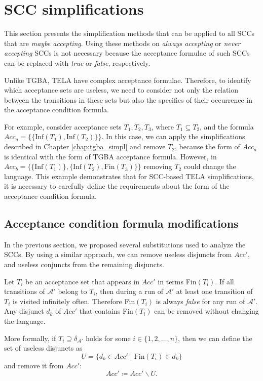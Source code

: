 \documentclass[
  digital, %
  twoside, %
  table,   %
  lof,     %
  lot,     %
]{fithesis3}
\begin{document}
\section{SCC simplifications}
This section presents the simplification methods that can be applied to all SCCs that are \emph{maybe accepting}. Using these methods on \emph{always accepting} or \emph{never accepting} SCCs is not necessary because the acceptance formulae of such SCCs can be replaced with \emph{true} or \emph{false}, respectively. 

Unlike TGBA, TELA have complex acceptance formulae. Therefore, to identify which acceptance sets are useless, we need to consider not only the relation between the transitions in these sets but also the specifics of their occurrence in the acceptance condition formula. 

For example, consider acceptance sets $T_1, T_2, T_3$, where $T_1 \subseteq T_2$, and the formula $Acc_a = \{\{\text{Inf}(T_1), \text{Inf}(T_2)\}\}$. In this case, we can apply the simplifications described in Chapter \ref{chap:tgba_simpl} and remove $T_2$, because the form of $Acc_a$ is identical with the form of TGBA acceptance formula. However, in $Acc_b = \{\{\text{Inf}(T_1)\}, \{\text{Inf}(T_2), \text{Fin}(T_3)\}\}$ removing $T_2$ could change the language. This example demonstrates that for SCC-based TELA simplifications, it is necessary to carefully define the requirements about the form of the acceptance condition formula.

\subsection{Acceptance condition formula modifications}
In the previous section, we proposed several substitutions used to analyze the SCCs. By using a similar approach, we can remove useless disjuncts from $Acc'$, and useless conjuncts from the remaining disjuncts.

Let $T_i$ be an acceptance set that appears in $Acc'$ in terms Fin$(T_i)$. If all transitions of $\mathcal{A'}$ belong to $T_i$, then during a run of $\mathcal{A'}$ at least one transition of $T_i$ is visited infinitely often. Therefore Fin$(T_i)$ is always \emph{false} for any run of $\mathcal{A'}$. Any disjunct $d_k$ of $Acc'$ that contains Fin$(T_i)$ can be removed without changing the language.

More formally, if $T_i \supseteq \delta_{\mathcal{A'}}$ holds for some $i \in \{1,2, \dots, n\}$, then we can define the set of useless disjuncts as
\begin{equation*}
  U = \{d_k \in Acc' \mid \text{Fin}(T_i) \in d_k \}
\end{equation*}
and remove it from $Acc'$:
\begin{equation*}
  Acc' \coloneqq Acc' \smallsetminus U.
\end{equation*}
\end{document}
